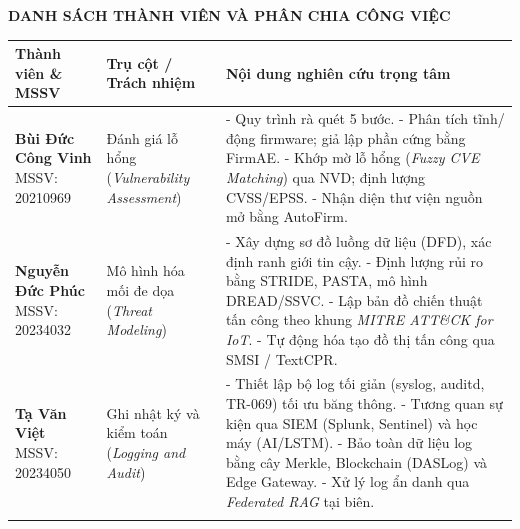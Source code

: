 \documentclass[../DoAn.tex]{subfiles}
\begin{document}
\begin{center}
    \textbf{DANH SÁCH THÀNH VIÊN VÀ PHÂN CHIA CÔNG VIỆC}
\end{center}

\begin{table}[H]
\centering
\small %

\begin{tabularx}{\textwidth}{>{\raggedright\arraybackslash}p{3cm} >{\raggedright\arraybackslash}p{3cm} X}
\toprule
\textbf{Thành viên \& MSSV} & \textbf{Trụ cột / Trách nhiệm} & \textbf{Nội dung nghiên cứu trọng tâm} \\ 
\midrule

\textbf{Bùi Đức Công Vinh} \newline MSSV: 20210969 
& Đánh giá lỗ hổng \newline (\textit{Vulnerability Assessment}) 
& - Quy trình rà quét 5 bước. \newline
  - Phân tích tĩnh/động firmware; giả lập phần cứng bằng FirmAE. \newline
  - Khớp mờ lỗ hổng (\textit{Fuzzy CVE Matching}) qua NVD; định lượng CVSS/EPSS. \newline
  - Nhận diện thư viện nguồn mở bằng AutoFirm. \\ \addlinespace[0.6em]

\textbf{Nguyễn Đức Phúc} \newline MSSV: 20234032 
& Mô hình hóa mối đe dọa \newline (\textit{Threat Modeling}) 
& - Xây dựng sơ đồ luồng dữ liệu (DFD), xác định ranh giới tin cậy. \newline
  - Định lượng rủi ro bằng STRIDE, PASTA, mô hình DREAD/SSVC. \newline
  - Lập bản đồ chiến thuật tấn công theo khung \textit{MITRE ATT\&CK for IoT}. \newline
  - Tự động hóa tạo đồ thị tấn công qua SMSI / TextCPR. \\ \addlinespace[0.6em]

\textbf{Tạ Văn Việt} \newline MSSV: 20234050 
& Ghi nhật ký và kiểm toán \newline (\textit{Logging and Audit}) 
& - Thiết lập bộ log tối giản (syslog, auditd, TR-069) tối ưu băng thông. \newline
  - Tương quan sự kiện qua SIEM (Splunk, Sentinel) và học máy (AI/LSTM). \newline
  - Bảo toàn dữ liệu log bằng cây Merkle, Blockchain (DASLog) và Edge Gateway. \newline
  - Xử lý log ẩn danh qua \textit{Federated RAG} tại biên. \\ \addlinespace[0.6em]


\end{tabularx}
\end{table}
\end{document}
